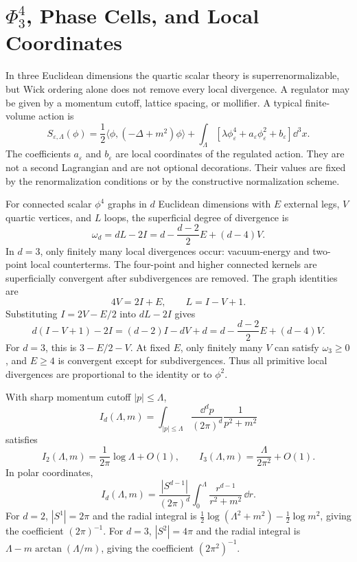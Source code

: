 \section{\texorpdfstring{\(\Phi^4_3\), Phase Cells, and Local Coordinates}{Phi-four-three, Phase Cells, and Local Coordinates}}

In three Euclidean dimensions the quartic scalar theory is
superrenormalizable, but Wick ordering alone does not remove every local
divergence.  A regulator may be given by a momentum cutoff, lattice spacing,
or mollifier.  A typical finite-volume action is
\begin{equation}
  S_{\varepsilon,\Lambda}(\phi)
  =
  \frac12\langle\phi,(-\Delta+m^2)\phi\rangle
  +
  \int_\Lambda
  \left[
    \lambda\phi_\varepsilon^4
    +a_\varepsilon\phi_\varepsilon^2
    +b_\varepsilon
  \right]\dd^3x .
  \label{eq:phi-four-three-regulated-action}
\end{equation}
The coefficients \(a_\varepsilon\) and \(b_\varepsilon\) are local
coordinates of the regulated action.  They are not a second Lagrangian and
are not optional decorations.  Their values are fixed by the renormalization
conditions or by the constructive normalization scheme.

For connected scalar \(\phi^4\) graphs in \(d\) Euclidean dimensions with
\(E\) external legs, \(V\) quartic vertices, and \(L\) loops, the superficial
degree of divergence is
\begin{equation}
  \omega_d
  =
  dL-2I
  =
  d-\frac{d-2}{2}E+(d-4)V .
  \label{eq:phi-four-superficial-degree}
\end{equation}
In \(d=3\), only finitely many local divergences occur: vacuum-energy and
two-point local counterterms.  The four-point and higher connected kernels
are superficially convergent after subdivergences are removed.
The graph identities are
\[
  4V=2I+E,\qquad L=I-V+1 .
\]
Substituting \(I=2V-E/2\) into \(dL-2I\) gives
\[
  d(I-V+1)-2I
  =
  (d-2)I-dV+d
  =
  d-\frac{d-2}{2}E+(d-4)V .
\]
For \(d=3\), this is \(3-E/2-V\).  At fixed \(E\), only finitely many \(V\)
can satisfy \(\omega_3\geq0\), and \(E\geq4\) is convergent except for
subdivergences.  Thus all primitive local divergences are proportional to
the identity or to \(\phi^2\).

With sharp momentum cutoff \(|p|\leq\Lambda\),
\[
  I_d(\Lambda,m)
  =
  \int_{|p|\leq\Lambda}
  \frac{\dd^dp}{(2\pi)^d}\frac{1}{p^2+m^2}
\]
satisfies
\begin{equation}
  I_2(\Lambda,m)
  =
  \frac{1}{2\pi}\log\Lambda+O(1),
  \qquad
  I_3(\Lambda,m)
  =
  \frac{\Lambda}{2\pi^2}+O(1).
  \label{eq:tadpole-cutoff-asymptotics}
\end{equation}
In polar coordinates,
\[
  I_d(\Lambda,m)
  =
  \frac{|S^{d-1}|}{(2\pi)^d}
  \int_0^\Lambda \frac{r^{d-1}}{r^2+m^2}\,\dd r .
\]
For \(d=2\), \(|S^1|=2\pi\) and the radial integral is
\(\frac12\log(\Lambda^2+m^2)-\frac12\log m^2\), giving the coefficient
\((2\pi)^{-1}\).  For \(d=3\), \(|S^2|=4\pi\) and the radial integral is
\(\Lambda-m\arctan(\Lambda/m)\), giving the coefficient \((2\pi^2)^{-1}\).

